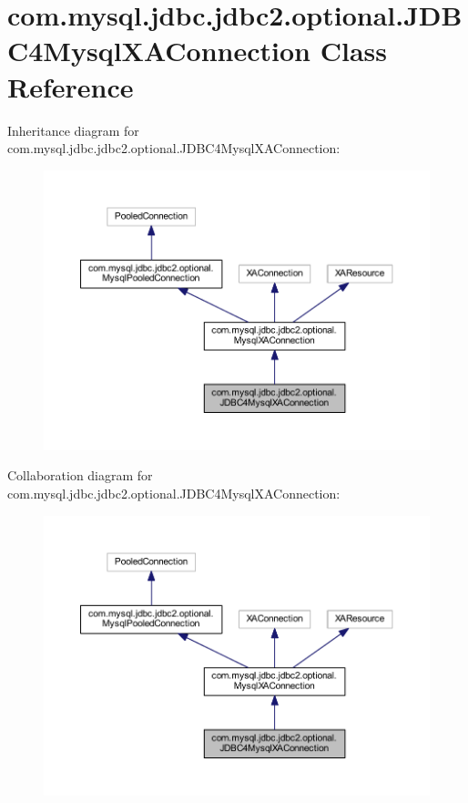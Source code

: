 \hypertarget{classcom_1_1mysql_1_1jdbc_1_1jdbc2_1_1optional_1_1_j_d_b_c4_mysql_x_a_connection}{}\section{com.\+mysql.\+jdbc.\+jdbc2.\+optional.\+J\+D\+B\+C4\+Mysql\+X\+A\+Connection Class Reference}
\label{classcom_1_1mysql_1_1jdbc_1_1jdbc2_1_1optional_1_1_j_d_b_c4_mysql_x_a_connection}


Inheritance diagram for com.\+mysql.\+jdbc.\+jdbc2.\+optional.\+J\+D\+B\+C4\+Mysql\+X\+A\+Connection\+:
\nopagebreak
\begin{figure}[H]
\begin{center}
\leavevmode
\includegraphics[width=350pt]{classcom_1_1mysql_1_1jdbc_1_1jdbc2_1_1optional_1_1_j_d_b_c4_mysql_x_a_connection__inherit__graph}
\end{center}
\end{figure}


Collaboration diagram for com.\+mysql.\+jdbc.\+jdbc2.\+optional.\+J\+D\+B\+C4\+Mysql\+X\+A\+Connection\+:
\nopagebreak
\begin{figure}[H]
\begin{center}
\leavevmode
\includegraphics[width=350pt]{classcom_1_1mysql_1_1jdbc_1_1jdbc2_1_1optional_1_1_j_d_b_c4_mysql_x_a_connection__coll__graph}
\end{center}
\end{figure}
